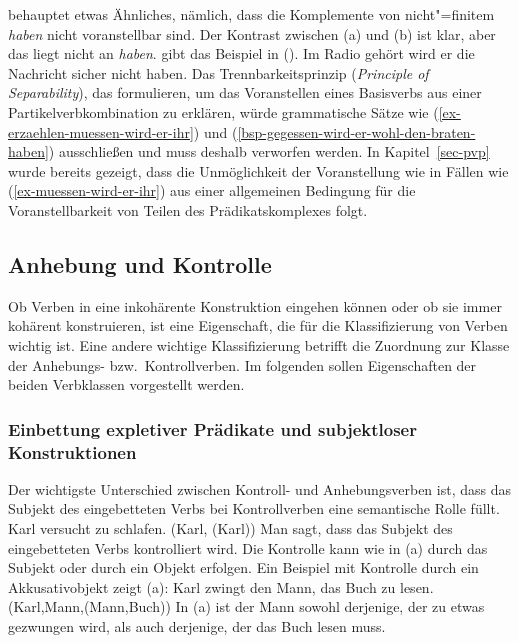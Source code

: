 \noindent
\citet[]{Haider93a} behauptet etwas Ähnliches, nämlich, dass
die Komplemente von nicht"=finitem \emph{haben} nicht voranstellbar sind.
\eal
{}
\zl
Der Kontrast zwischen (a) und (b) ist klar, aber das liegt nicht
an \emph{haben}. \citet[]{Meurers2000b} gibt das Beispiel
in ().
\ea
Im Radio gehört wird er die Nachricht sicher nicht haben.
\z
Das Trennbarkeitsprinzip (\emph{Principle of Separability}),
das \citet[]{SW94a}
formulieren, um das Voranstellen eines Basisverbs aus einer Partikelverbkombination
zu erklären, würde grammatische Sätze wie (\ref{ex-erzaehlen-muessen-wird-er-ihr}) 
und (\ref{bsp-gegessen-wird-er-wohl-den-braten-haben}) ausschließen und muss deshalb verworfen werden.
In Kapitel~\ref{sec-pvp} wurde bereits gezeigt, dass die Unmöglichkeit der
Voranstellung wie in Fällen wie (\ref{ex-muessen-wird-er-ihr}) aus einer allgemeinen
Bedingung für die Voranstellbarkeit von Teilen des Prädikatskomplexes folgt.



\subsection{Anhebung und Kontrolle}
\label{sec-anhebung}

Ob Verben in eine inkohärente Konstruktion eingehen können
oder ob sie immer kohärent konstruieren, ist eine Eigenschaft, die für die Klassifizierung
von Verben wichtig ist. Eine andere wichtige Klassifizierung betrifft die Zuordnung zur Klasse
der Anhebungs- bzw.\ Kontrollverben. Im folgenden sollen Eigenschaften der beiden Verbklassen 
vorgestellt werden.

\subsubsection{Einbettung expletiver Prädikate und subjektloser Konstruktionen}
\label{expl-pred-subj-constr}

Der wichtigste Unterschied zwischen Kontroll- und Anhebungsverben ist, dass das Subjekt
des eingebetteten Verbs bei Kontrollverben eine semantische Rolle füllt.
\eal
\ex Karl versucht zu schlafen.
\ex {}(Karl, (Karl))
\zl
Man sagt, dass das Subjekt des eingebetteten Verbs kontrolliert wird. Die Kontrolle
kann wie in (a) durch das Subjekt oder durch ein Objekt erfolgen. Ein Beispiel
mit Kontrolle durch ein Akkusativobjekt zeigt (a):
\eal
\ex Karl zwingt den Mann, das Buch zu lesen.
\ex {}(Karl,Mann,(Mann,Buch))
\zl
In (a) ist der Mann sowohl derjenige, der zu etwas gezwungen wird, als auch
derjenige, der das Buch lesen muss.

